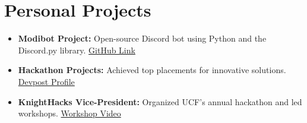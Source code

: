 \documentclass[letterpaper,11pt]{article}
\newcommand{\resumeSubHeadingListStart}{\begin{itemize}[leftmargin=*]}
\newcommand{\resumeSubHeadingListEnd}{\end{itemize}}
\begin{document}
\section{Personal Projects}
    \resumeSubHeadingListStart \itemsep -2pt %
      \item \textbf{Modibot Project:} Open-source Discord bot using Python and the Discord.py library. \href{https://github.com/lienne/ModiBot}{GitHub Link}
      \item \textbf{Hackathon Projects:} Achieved top placements for innovative solutions. \href{https://devpost.com/lienne}{Devpost Profile}
      \item \textbf{KnightHacks Vice-President:} Organized UCF’s annual hackathon and led workshops. \href{https://www.youtube.com/watch?v=1cuhODT6MGM}{Workshop Video}
    \resumeSubHeadingListEnd
    
    
\end{document}
